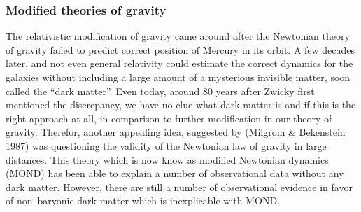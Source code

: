 \documentclass[paper=a4, fontsize=11pt]{scrartcl} %
\numberwithin{equation}{section} %
\numberwithin{figure}{section} %
\numberwithin{table}{section} %
\begin{document}
\subsubsection*{Modified theories of gravity}
The relativistic modification of gravity came around after the Newtonian theory of gravity failed to predict correct position of Mercury in its orbit. A few decades later, and not even general relativity could estimate the correct dynamics for the galaxies without including a large amount of a mysterious invisible matter, soon called the ``dark matter''. Even today, around 80 years after Zwicky first mentioned the discrepancy, we have no clue what dark matter is and if this is the right approach at all, in comparison to further modification in our theory of gravity. 
Therefor, another appealing idea, suggested by (Milgrom \& Bekenstein 1987) was questioning the validity of the Newtonian law of gravity in large distances. This theory which is now know as modified Newtonian dynamics (MOND) has been able to explain a number of observational data without any dark matter. However, there are still a number of observational evidence in favor of non--baryonic dark matter which is inexplicable with MOND. 




\newpage
\end{document}
